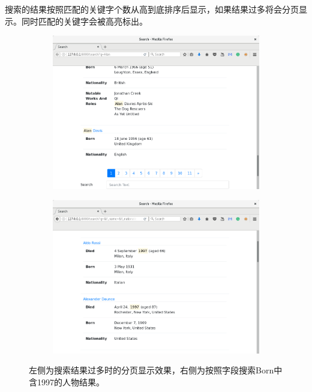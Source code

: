 \documentclass[11pt,a4paper]{article}
\begin{document}
搜索的结果按照匹配的关键字个数从高到底排序后显示，如果结果过多将会分页显示。同时匹配的关键字会被高亮标出。

\begin{figure}[H]
	\centering
	\begin{subfigure}{.49\textwidth}
		\centering
		\includegraphics[width=\linewidth]{page.png}
	\end{subfigure}
	\hfill
	\begin{subfigure}{.49\textwidth}
		\centering
		\includegraphics[width=\linewidth]{title-born.png}
	\end{subfigure}
	\caption{左侧为搜索结果过多时的分页显示效果，右侧为按照字段搜索Born中含1997的人物结果。}
\end{figure}
\end{document}
